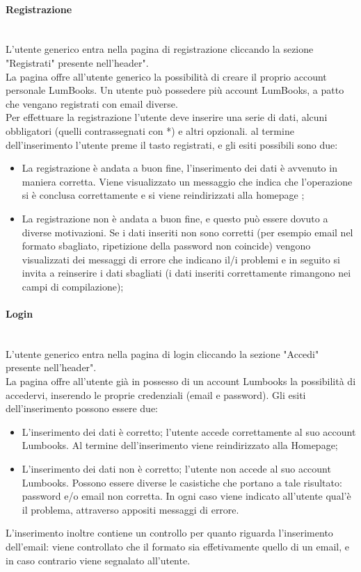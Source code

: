 \paragraph{Registrazione}\mbox{}\\
\label{par:Reg}
L'utente generico entra nella pagina di registrazione cliccando la sezione "Registrati" presente nell'header".\\
La pagina offre all'utente generico la possibilità di creare il proprio account personale LumBooks. Un utente può possedere più account LumBooks, a patto che vengano registrati con email diverse.\\
Per effettuare la registrazione l'utente deve inserire una serie di dati, alcuni obbligatori (quelli contrassegnati con *) e altri opzionali. al termine dell'inserimento l'utente preme il tasto registrati, e gli esiti possibili sono due:
\begin{itemize}
	\item La registrazione è andata a buon fine, l'inserimento dei dati è avvenuto in maniera corretta. Viene visualizzato un messaggio che indica che l'operazione si è conclusa correttamente e si viene reindirizzati alla homepage ;
	\item La registrazione non è andata a buon fine, e questo può essere dovuto a diverse motivazioni. Se i dati inseriti non sono corretti (per esempio email nel formato sbagliato, ripetizione della password non coincide) vengono visualizzati dei messaggi di errore che indicano il/i problemi e in seguito si invita a reinserire i dati sbagliati (i dati inseriti correttamente rimangono nei campi di compilazione);
\end{itemize}

\paragraph{Login}\mbox{}\\
\label{par:Login}
L'utente generico entra nella pagina di login cliccando la sezione "Accedi" presente nell'header".\\
La pagina offre all'utente già in possesso di un account Lumbooks la possibilità di accedervi, inserendo le proprie credenziali (email e password). Gli esiti dell'inserimento possono essere due:
\begin{itemize}
	\item L'inserimento dei dati è corretto; l'utente accede correttamente al suo account Lumbooks. Al termine dell'inserimento viene reindirizzato alla Homepage;
	\item L'inserimento dei dati non è corretto; l'utente non accede al suo account Lumbooks. Possono essere diverse le casistiche che portano a tale risultato: password e/o email non corretta. In ogni caso viene indicato all'utente qual'è il problema, attraverso appositi messaggi di errore. 
\end{itemize}
L'inserimento inoltre contiene un controllo per quanto riguarda l'inserimento dell'email: viene controllato che il formato sia effetivamente quello di un email, e in caso contrario viene segnalato all'utente.



